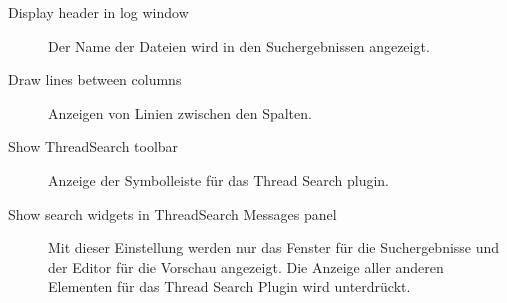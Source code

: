 \begin{description}
\item[Display header in log window] Der Name der Dateien wird in den Suchergebnissen angezeigt.
\item[Draw lines between columns] Anzeigen von Linien zwischen den Spalten.
\item[Show ThreadSearch toolbar] Anzeige der Symbolleiste für das Thread Search plugin.
\item[Show search widgets in ThreadSearch Messages panel] Mit dieser Einstellung werden nur das Fenster für die Suchergebnisse und der Editor für die Vorschau angezeigt. Die Anzeige aller anderen Elementen für das Thread Search Plugin wird unterdrückt.
\end{description}
